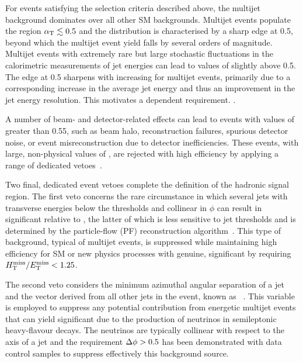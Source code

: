 For events satisfying the selection criteria described above, the
multijet background dominates over all other SM backgrounds. Multijet
events populate the region $\alphat \lesssim 0.5$ and the \alphat
distribution is characterised by a sharp edge at 0.5, beyond which the
multijet event yield falls by several orders of magnitude. 
Multijet events with extremely rare but large stochastic fluctuations in the
calorimetric measurements of jet energies can lead to values of
\alphat slightly above 0.5. The edge at 0.5 sharpens with increasing
\scalht for multijet events, primarily due to a corresponding increase
in the average jet energy and thus an improvement in the jet energy
resolution. This motivates a \scalt dependent \alphat requirement. .


A number of beam- and detector-related effects can lead to events with
values of \alphat greater than 0.55, such as beam halo, reconstruction
failures, spurious detector noise, or event misreconstruction due to
detector inefficiencies. These events, with large, non-physical values
of \met, are rejected with high efficiency by applying a range of
dedicated vetoes~\cite{RA1Paper2012, cms-met}.

Two final, dedicated event vetoes complete the definition of the
hadronic signal region. The first veto concerns the rare circumstance
in which several jets with transverse energies below the \Et
thresholds and collinear in $\phi$ can result in significant \mht
relative to \met, the latter of which is less sensitive to jet \Et
thresholds and is determined by the particle-flow (PF) reconstruction
algorithm~\cite{CMS-PAS-PFT-09-001, CMS-PAS-PFT-10-001}. This type of
background, typical of multijet events, is suppressed while
maintaining high efficiency for SM or new physics processes with
genuine, significant \met by requiring $\mht / \met < 1.25$. 

The second veto considers the minimum azimuthal angular separation of
a jet and the \mht vector derived from all other jets in the event,
known as \dphi~\cite{RA1Paper}. This variable is employed to suppress
any potential contribution from energetic multijet events that can
yield significant \met due to the production of neutrinos in
semileptonic heavy-flavour decays. The neutrinos are typically
collinear with respect to the axis of a jet and the requirement $\dphi
> 0.5$ has been demonstrated with data control samples to suppress
effectively this background source.

